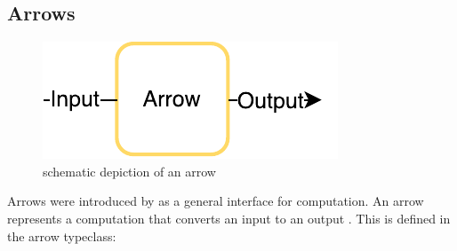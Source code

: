 \subsection{Arrows}
\label{sec:arrows}
\begin{figure}[h]
	\includegraphics{images/arrow}
	\caption{schematic depiction of an arrow}
\end{figure}
Arrows were introduced by \citet{HughesArrows} as a general interface for computation. An arrow  represents  a computation that converts an input  to an output . This is defined in the arrow typeclass:

